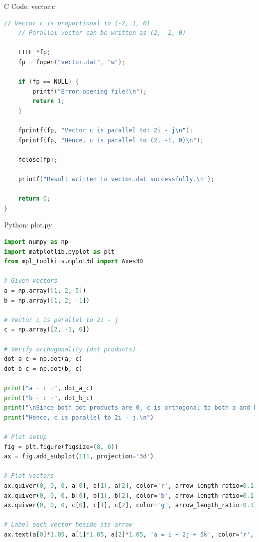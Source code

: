 \documentclass{beamer}
\numberwithin{equation}{section}
\theoremstyle{remark}
\begin{document}
\begin{frame}[fragile]{C Code: vector.c}
\begin{lstlisting}[language=C]
    // Vector c is proportional to (-2, 1, 0)
    // Parallel vector can be written as (2, -1, 0)

    FILE *fp;
    fp = fopen("vector.dat", "w");

    if (fp == NULL) {
        printf("Error opening file!\n");
        return 1;
    }

    fprintf(fp, "Vector c is parallel to: 2i - j\n");
    fprintf(fp, "Hence, c is parallel to (2, -1, 0)\n");

    fclose(fp);

    printf("Result written to vector.dat successfully.\n");

    return 0;
}


\end{lstlisting}
\end{frame}

\begin{frame}[fragile]{Python: plot.py}
\begin{lstlisting}[language=Python]
import numpy as np
import matplotlib.pyplot as plt
from mpl_toolkits.mplot3d import Axes3D

# Given vectors
a = np.array([1, 2, 5])
b = np.array([1, 2, -1])

# Vector c is parallel to 2i - j
c = np.array([2, -1, 0])

# Verify orthogonality (dot products)
dot_a_c = np.dot(a, c)
dot_b_c = np.dot(b, c)

print("a · c =", dot_a_c)
print("b · c =", dot_b_c)
print("\nSince both dot products are 0, c is orthogonal to both a and b.")
print("Hence, c is parallel to 2i - j.\n")

# Plot setup
fig = plt.figure(figsize=(8, 6))
ax = fig.add_subplot(111, projection='3d')

# Plot vectors
ax.quiver(0, 0, 0, a[0], a[1], a[2], color='r', arrow_length_ratio=0.1)
ax.quiver(0, 0, 0, b[0], b[1], b[2], color='b', arrow_length_ratio=0.1)
ax.quiver(0, 0, 0, c[0], c[1], c[2], color='g', arrow_length_ratio=0.1)

# Label each vector beside its arrow
ax.text(a[0]*1.05, a[1]*1.05, a[2]*1.05, 'a = i + 2j + 5k', color='r', fontsize=10)
\end{lstlisting}
\end{frame}
\end{document}
